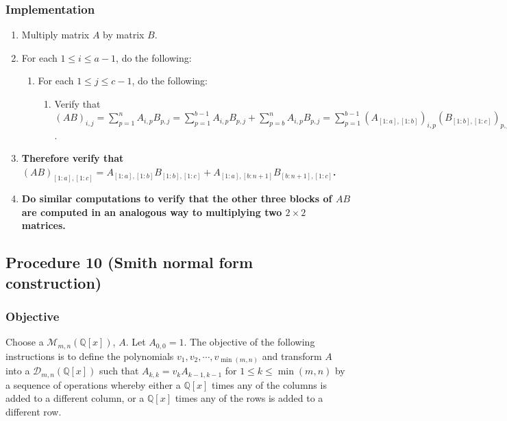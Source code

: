 \documentclass[twocolumn]{article}
\begin{document}
			\subsubsection{Implementation}
				\begin{enumerate}
					\item Multiply matrix $A$ by matrix $B$.
					\item For each $1\le i\le a-1$, do the following:
					\begin{enumerate}
						\item For each $1\le j\le c-1$, do the following:
							\begin{enumerate}
								\item Verify that $(AB)_{i,j}=\sum_{p=1}^n A_{i,p}B_{p,j}=\sum_{p=1}^{b-1} A_{i,p}B_{p,j}+\sum_{p=b}^n A_{i,p}B_{p,j}=\sum_{p=1}^{b-1} (A_{[1:a],[1:b]})_{i,p}(B_{[1:b],[1:c]})_{p,j}+\sum_{p=1}^{1+n-b} (A_{[1:a],[b:n+1]})_{i,p}(B_{[b:n+1],[1:c]})_{p,j}=(A_{[1:a],[1:b]}B_{[1:b],[1:c]})_{i,j}+(A_{[1:a],[b:n+1]}B_{[b:n+1],[1:c]})_{i,j}$.
							\end{enumerate}
					\end{enumerate}
					\item \textbf{Therefore verify that $(AB)_{[1:a],[1:c]}=A_{[1:a],[1:b]}B_{[1:b],[1:c]}+A_{[1:a],[b:n+1]}B_{[b:n+1],[1:c]}$.}
					\item \textbf{Do similar computations to verify that the other three blocks of $AB$ are computed in an analogous way to multiplying two $2\times 2$ matrices.}
				\end{enumerate}
		\subsection{Procedure 10 (Smith normal form construction)}\label{sec:procedure 10}
			\subsubsection{Objective}
				Choose a $\mathcal{M}_{m,n}(\mathbb{Q}[x])$, $A$. Let $A_{0,0}=1$. The objective of the following instructions is to define the polynomials $v_1,v_2,\cdots,v_{\min(m,n)}$ and transform $A$ into a $\mathcal{D}_{m,n}(\mathbb{Q}[x])$ such that $A_{k,k}=v_kA_{k-1,k-1}$ for $1\le k\le\min(m,n)$ by a sequence of operations whereby either a $\mathbb{Q}[x]$ times any of the columns is added to a different column, or a $\mathbb{Q}[x]$ times any of the rows is added to a different row.
\end{document}

